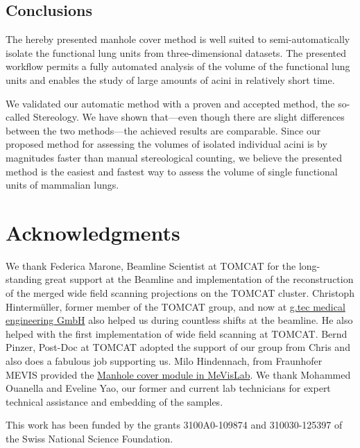 \documentclass[%
	paper=a4,%
	abstract=true,%
	]{scrartcl}
\begin{document}
\subsection{Conclusions}
The hereby presented manhole cover method is well suited to semi-automatically isolate the functional lung units from three-dimensional datasets. The presented workflow permits a fully automated analysis of the volume of the functional lung units and enables the study of large amounts of acini in relatively short time.

We validated our automatic method with a proven and accepted method, the so-called Stereology. We have shown that---even though there are slight differences between the two methods---the achieved results are comparable. Since our proposed method for assessing the volumes of isolated individual acini is by magnitudes faster than manual stereological counting, we believe the presented method is the easiest and fastest way to assess the volume of single functional units of mammalian lungs.

\clearpage
\section{Acknowledgments}
We thank Federica Marone, Beamline Scientist at TOMCAT for the long-standing great support at the Beamline and implementation of the reconstruction of the merged wide field scanning projections on the TOMCAT cluster. Christoph Hintermüller, former member of the TOMCAT group, and now at \href{http://gtec.at/}{g.tec medical engineering GmbH} also helped us during countless shifts at the beamline. He also helped with the first implementation of wide field scanning at TOMCAT. Bernd Pinzer, Post-Doc at TOMCAT adopted the support of our group from Chris and also does a fabulous job supporting us. Milo Hindennach, from Fraunhofer MEVIS provided the \href{http://www.mevis-research.de/cgi-bin/discus/board-auth.cgi?lm=1282233250&file=/839/11760.html}{Manhole cover module in MeVisLab}. We thank Mohammed Ouanella and Eveline Yao, our former and current lab technicians for expert technical assistance and embedding of the samples.

This work has been funded by the grants 3100A0-109874 and 310030-125397 of the Swiss National Science Foundation.

\clearpage
\singlespacing


\end{document}
